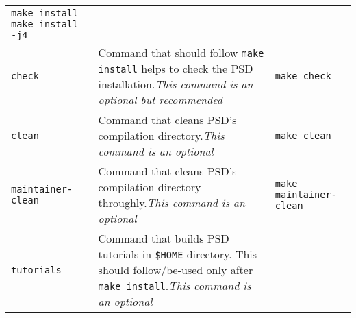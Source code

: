 \begin{longtable}[]{@{}lll@{}}
\begin{minipage}[t]{0.30\columnwidth}
\lstinline!make install! \lstinline!make install -j4!\strut
\end{minipage}\tabularnewline
\begin{minipage}[t]{0.15\columnwidth}\raggedright\strut
\lstinline!check!\strut
\end{minipage} & \begin{minipage}[t]{0.47\columnwidth}\raggedright\strut
Command that should follow \lstinline!make install! helps to check the
PSD installation.\emph{This command is an optional but
recommended}\strut
\end{minipage} & \begin{minipage}[t]{0.30\columnwidth}\raggedright\strut
\lstinline!make check!\strut
\end{minipage}\tabularnewline
\begin{minipage}[t]{0.15\columnwidth}\raggedright\strut
\lstinline!clean!\strut
\end{minipage} & \begin{minipage}[t]{0.47\columnwidth}\raggedright\strut
Command that cleans PSD's compilation directory.\emph{This command is an
optional}\strut
\end{minipage} & \begin{minipage}[t]{0.30\columnwidth}\raggedright\strut
\lstinline!make clean!\strut
\end{minipage}\tabularnewline
\begin{minipage}[t]{0.15\columnwidth}\raggedright\strut
\lstinline!maintainer-clean!\strut
\end{minipage} & \begin{minipage}[t]{0.47\columnwidth}\raggedright\strut
Command that cleans PSD's compilation directory throughly.\emph{This
command is an optional}\strut
\end{minipage} & \begin{minipage}[t]{0.30\columnwidth}\raggedright\strut
\lstinline!make maintainer-clean!\strut
\end{minipage}\tabularnewline
\begin{minipage}[t]{0.15\columnwidth}\raggedright\strut
\lstinline!tutorials!\strut
\end{minipage} & \begin{minipage}[t]{0.47\columnwidth}\raggedright\strut
Command that builds PSD tutorials in \lstinline!$HOME! directory. This
should follow/be-used only after \lstinline!make install!.\emph{This
command is an optional}\strut
\end{minipage} & \begin{minipage}[t]{0.30\columnwidth}\raggedright\strut

\end{minipage}
\end{longtable}
